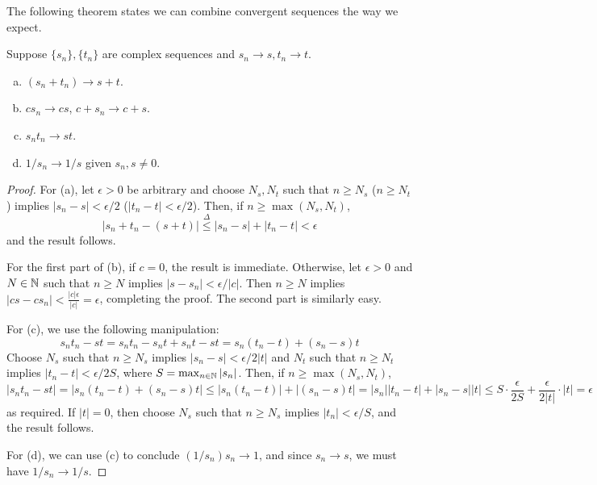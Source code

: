 The following theorem states we can combine convergent sequences the way we expect. 

\begin{theorem} %
Suppose $\{s_n\}, \{t_n\}$ are complex sequences and $s_n \to s, t_n \to t$.
\begin{enumerate}[(a)]
\item $(s_n + t_n) \to s + t$.
\item $cs_n \to cs$, $c + s_n \to c + s$.
\item $s_nt_n \to st$.
\item $1/s_n \to 1/s$ given $s_n, s \ne 0$.
\end{enumerate}

\begin{proof}
For (a), let $\epsilon > 0$ be arbitrary and choose $N_s, N_t$ such that $n \ge N_s$ ($n \ge N_t$) implies $|s_n - s| < \epsilon/2$ ($|t_n - t| < \epsilon/2$). Then, if $n \ge \max(N_s, N_t)$,
\[
	|s_n + t_n - (s + t)| \overset{\Delta}{\le} |s_n - s| + |t_n - t| < \epsilon
\]
and the result follows.

For the first part of (b), if $c = 0$, the result is immediate. Otherwise, let $\epsilon > 0$ and $N \in \mathbb{N}$ such that $n \ge N$ implies $|s - s_n| < \epsilon/|c|$. Then $n \ge N$ implies $|cs - cs_n| < \frac{|c| \epsilon}{|c|} = \epsilon$, completing the proof. The second part is similarly easy.

For (c), we use the following manipulation:
\[
	s_nt_n - st = s_nt_n - s_nt + s_nt - st = s_n(t_n - t) + (s_n - s)t
\]
Choose $N_s$ such that $n \ge N_s$ implies $|s_n - s| < \epsilon/2|t|$ and $N_t$ such that $n \ge N_t$ implies $|t_n - t| < \epsilon/2S$, where $S = \max_{n\in\mathbb{N}} |s_n|$. Then, if $n \ge \max(N_s, N_t)$, 
\[
	|s_nt_n - st| = |s_n(t_n - t) + (s_n - s)t| \le |s_n(t_n - t)| + |(s_n - s)t| = |s_n||t_n - t| + |s_n - s||t| \le S \cdot \frac{\epsilon}{2S} + \frac{\epsilon}{2|t|} \cdot |t| = \epsilon
\]
as required. If $|t| = 0$, then choose $N_s$ such that $n \ge N_s$ implies $|t_n| < \epsilon / S$, and the result follows.

For (d), we can use (c) to conclude $(1/s_n) s_n \to 1$, and since $s_n \to s$, we must have $1/s_n \to 1/s$.
\end{proof}
\end{theorem}

